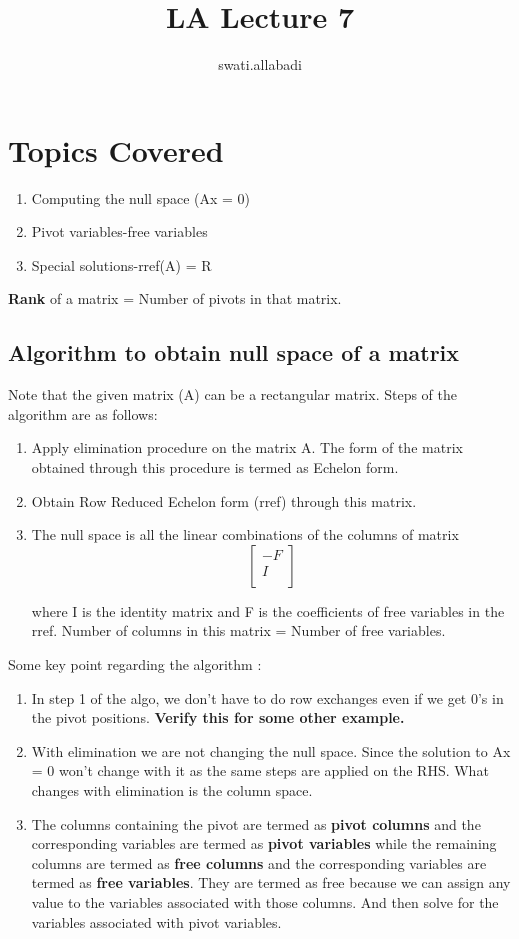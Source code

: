 \documentclass{article}
\title{LA Lecture 7}
\author{swati.allabadi }
\date{}
\begin{document}
\maketitle

\section{Topics Covered}
\begin{enumerate}
    \item Computing the null space (Ax = 0)
    \item Pivot variables-free variables
    \item Special solutions-rref(A) = R
    
\end{enumerate}
\textbf{Rank} of a matrix = Number of pivots in that matrix. 
\subsection{Algorithm to obtain null space of a matrix }
Note that the given matrix (A) can be a rectangular matrix.
Steps of the algorithm are as follows:
\begin{enumerate}
    \item Apply elimination procedure on the matrix A. The form of the matrix obtained through this procedure is termed as Echelon form.
    \item Obtain Row Reduced Echelon form (rref) through this matrix.
    \item The null space is all the linear combinations of the columns of matrix \[ \begin{bmatrix}
    -F\\
    I\\
    \end{bmatrix} \]
    
    where I is the identity matrix and F is the coefficients of free variables in the rref.
    \newline
    Number of columns in this matrix = Number of free  variables.
\end{enumerate}
Some key point regarding the algorithm :
\begin{enumerate}
    \item In step 1 of the algo, we don't have to do  row exchanges even if we get 0's in the pivot positions.
    \textbf{Verify this for some other example.}
    \item With elimination we are not changing the null space. Since the solution to Ax = 0 won't change with it as the same steps are applied on the RHS.
    What changes with elimination is the column space.
    \item The columns containing the pivot are termed as \textbf{pivot columns} and the corresponding variables are termed as \textbf{pivot variables} while the remaining columns are termed as \textbf{free columns} and the corresponding variables are termed as \textbf{free variables}. They are termed as free because we can assign any value to the variables associated with those columns. And then solve for the variables associated with pivot variables.
    
\end{enumerate}
\end{document}

